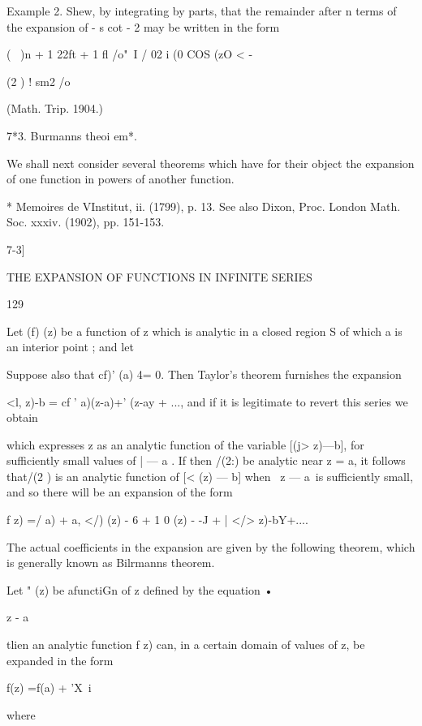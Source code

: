 Example 2. Shew, by integrating by parts, that the remainder after n terms of the 
expansion of - s cot - 2 may be written in the form 

( \  )n + 1 22ft + 1 fl 
/o"\ I   / 02 i (0 COS (zO < - 

(2 ) ! sm2 /o   

(Math. Trip. 1904.) 

7*3. Burmanns theoi em*. 

We shall next consider several theorems which have for their object the 
expansion of one function in powers of another function. 

* Memoires de VInstitut, ii. (1799), p. 13. See also Dixon, Proc. London Math. Soc. xxxiv. 
(1902), pp. 151-153. 



7-3] 



THE EXPANSION OF FUNCTIONS IN INFINITE SERIES 



129 



Let (f) (z) be a function of z which is analytic in a closed region S of which 
a is an interior point ; and let 

Suppose also that cf)' (a) 4= 0. Then Taylor's theorem furnishes the 
expansion 

<l, z)-b = cf ' a)(z-a)+' (z-ay + ..., 
and if it is legitimate to revert this series we obtain 

which expresses z as an analytic function of the variable [(j> z)—b], for 
sufficiently small values of |  — a . If then /(2:) be analytic near z = a, it 
follows that/(2 ) is an analytic function of [<  (z) — b] when \ z — a\ is sufficiently 
small, and so there will be an expansion of the form 

f z) =/ a) + a,  </) (z) - 6  + 1   0 (z) -  -J  + |   </>  z)-bY+.... 

The actual coefficients in the expansion are given by the following 
theorem, which is generally known as Bilrmanns theorem. 

Let " (z) be afunctiGn of z defined by the equation • 

z - a 

tlien an analytic function f z) can, in a certain domain of values of z, be 
expanded in the form 

f(z) =f(a) + 'X\ i %



where 



